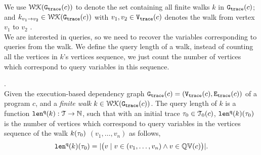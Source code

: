 We use $\mathcal{WK}(\mathtt{{G_{trace}}}(c))$ to denote 
the set containing all finite walks $k$ in $\mathtt{{G_{trace}}}(c)$;
and $k_{v_1 \to v_2} \in \mathcal{WK}(\mathtt{{G_{trace}}}(c))$ with $v_1, v_2 \in \mathtt{{V_{trace}}}(c)$ denotes the walk from vertex $v_1$ to $v_2$ . 
\\
We are interested in queries, so we need to recover the 
variables corresponding to queries from the walk. We define the query length of a walk, 
instead of counting all 
the vertices in $k$'s vertices sequence, we just count the number of vertices which correspond to query variables in this sequence.
%
\begin{defn}.
\label{def:qlen}
\\
Given 
the execution-based dependency graph 
$\mathtt{{G_{trace}}}({c}) = (\mathtt{{V_{trace}}}({c}), \mathtt{{E_{trace}}}({c}))$ of a program $c$,
 and a \emph{finite walk} 
 $k \in \mathcal{WK}(\mathtt{{G_{trace}}}(c))$. 
The query length of $k$ is a function $\mathtt{len}^{\tt q}(k): \mathcal{T} \to \mathbb{N}$, such that with an initial trace  $\mathtt{\tau}_0 \in \mathcal{T}_0(c)$, $\mathtt{len}^{\tt q}(k)(\mathtt{\tau}_0)$ is
the number of vertices which correspond to query variables in the vertices sequence of the walk $k(\mathtt{\tau}_0)$
$(v_1, \ldots, v_{n})$ as follows, 
\[
  \mathtt{len}^{\tt q}(k)(\mathtt{\tau}_0) = |\big( v \mid v \in (v_1, \ldots, v_{n}) \land v \in \mathbb{QV}(c) \big)|.
\]
\end{defn}
%
\subsection{}

